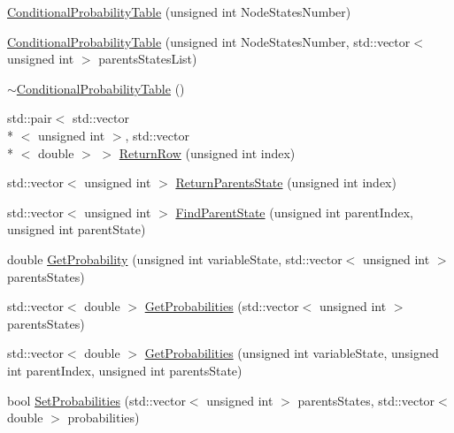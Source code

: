 \begin{DoxyCompactItemize}
\item 
\hyperlink{classbayonet_1_1_conditional_probability_table_a58abcca6946f80bfe3c86ccbbdeed31e}{Conditional\-Probability\-Table} (unsigned int Node\-States\-Number)
\item 
\hyperlink{classbayonet_1_1_conditional_probability_table_af83db269bcfc340658801d5e473ad5c8}{Conditional\-Probability\-Table} (unsigned int Node\-States\-Number, std\-::vector$<$ unsigned int $>$ parents\-States\-List)
\item 
\hyperlink{classbayonet_1_1_conditional_probability_table_a5fd07eba1d571bf8f8bac3014f2409b2}{$\sim$\-Conditional\-Probability\-Table} ()
\item 
std\-::pair$<$ std\-::vector\\*
$<$ unsigned int $>$, std\-::vector\\*
$<$ double $>$ $>$ \hyperlink{classbayonet_1_1_conditional_probability_table_a0f85eea7202955d5fd5c9366382afd53}{Return\-Row} (unsigned int index)
\item 
std\-::vector$<$ unsigned int $>$ \hyperlink{classbayonet_1_1_conditional_probability_table_a08a5837abe851b24de1ee1e2a7ab94b3}{Return\-Parents\-State} (unsigned int index)
\item 
std\-::vector$<$ unsigned int $>$ \hyperlink{classbayonet_1_1_conditional_probability_table_a9b946112b6d04692f855970186eabb02}{Find\-Parent\-State} (unsigned int parent\-Index, unsigned int parent\-State)
\item 
double \hyperlink{classbayonet_1_1_conditional_probability_table_aeb4965bc9b4903d5108fd9b6e1379e1b}{Get\-Probability} (unsigned int variable\-State, std\-::vector$<$ unsigned int $>$ parents\-States)
\item 
std\-::vector$<$ double $>$ \hyperlink{classbayonet_1_1_conditional_probability_table_a7612e2c40e51eaf4d94109adb2bd269d}{Get\-Probabilities} (std\-::vector$<$ unsigned int $>$ parents\-States)
\item 
std\-::vector$<$ double $>$ \hyperlink{classbayonet_1_1_conditional_probability_table_a93e9309f56608d368ca47c9ca02e51e6}{Get\-Probabilities} (unsigned int variable\-State, unsigned int parent\-Index, unsigned int parents\-State)
\item 
bool \hyperlink{classbayonet_1_1_conditional_probability_table_ac94cd225747e8f59c5497b860ff777c0}{Set\-Probabilities} (std\-::vector$<$ unsigned int $>$ parents\-States, std\-::vector$<$ double $>$ probabilities)
\item 

\end{DoxyCompactItemize}

